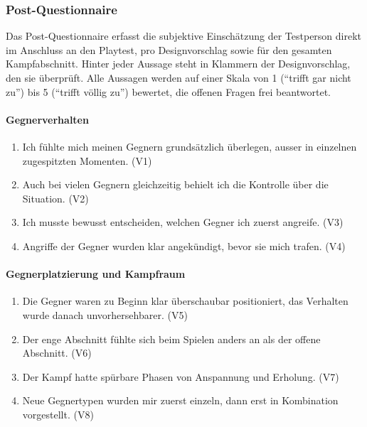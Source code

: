 \documentclass[../Main.tex]{subfiles}
\begin{document}
\subsubsection{Post-Questionnaire}
 
Das Post-Questionnaire erfasst die subjektive Einschätzung der Testperson direkt im Anschluss an den Playtest, pro Designvorschlag sowie für den gesamten Kampfabschnitt. Hinter jeder Aussage steht in Klammern der Designvorschlag, den sie überprüft. Alle Aussagen werden auf einer Skala von 1 (\enquote{trifft gar nicht zu}) bis 5 (\enquote{trifft völlig zu}) bewertet, die offenen Fragen frei beantwortet.
 
\paragraph{Gegnerverhalten}
\begin{enumerate}[label=\textbf{Q\arabic*}, leftmargin=1.5cm, itemsep=0.5em]
    \item Ich fühlte mich meinen Gegnern grundsätzlich überlegen, ausser in einzelnen zugespitzten Momenten. \hfill (V1)
    \item Auch bei vielen Gegnern gleichzeitig behielt ich die Kontrolle über die Situation. \hfill (V2)
    \item Ich musste bewusst entscheiden, welchen Gegner ich zuerst angreife. \hfill (V3)
    \item Angriffe der Gegner wurden klar angekündigt, bevor sie mich trafen. \hfill (V4)
\end{enumerate}
 
\paragraph{Gegnerplatzierung und Kampfraum}
\begin{enumerate}[label=\textbf{Q\arabic*}, leftmargin=1.5cm, itemsep=0.5em, resume]
    \item Die Gegner waren zu Beginn klar überschaubar positioniert, das Verhalten wurde danach unvorhersehbarer. \hfill (V5)
    \item Der enge Abschnitt fühlte sich beim Spielen anders an als der offene Abschnitt. \hfill (V6)
    \item Der Kampf hatte spürbare Phasen von Anspannung und Erholung. \hfill (V7)
    \item Neue Gegnertypen wurden mir zuerst einzeln, dann erst in Kombination vorgestellt. \hfill (V8)
\end{enumerate}
 
\end{document}
